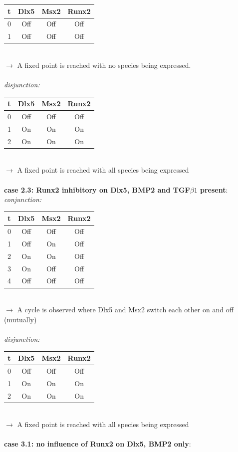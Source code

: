 \documentclass[11pt]{article}
\begin{document}
\begin{appendices}
\begin{tabular}{c c c c}
t & Dlx5 & Msx2 & Runx2 \\
\hline
0 & Off & Off & Off \\
1 & Off & Off & Off
\end{tabular}
\\
$\rightarrow$ A fixed point is reached with no species being expressed.  
\\ \\
\textit{disjunction:}
\\ 
\begin{tabular}{c c c c}
t & Dlx5 & Msx2 & Runx2 \\
\hline
0 & Off & Off & Off \\
1 & On & On & On \\
2 & On & On & On \\
\end{tabular}
\\
$\rightarrow$ A fixed point is reached with all species being expressed
\\ \\
\textbf{case 2.3: Runx2 inhibitory on Dlx5, BMP2 and TGF$\beta1$ present}: \\
\textit{conjunction:}
\\ 
\begin{tabular}{c c c c}
t & Dlx5 & Msx2 & Runx2 \\
\hline
0 & Off & Off & Off \\
1 & Off & On & Off \\
2 & On & On & Off \\
3 & On & Off & Off \\
4 & Off & Off & Off
\end{tabular}
\\
$\rightarrow$ A cycle is observed where Dlx5 and Msx2 switch each other on and off (mutually)  
\\ \\
\textit{disjunction:}
\\ 
\begin{tabular}{c c c c}
t & Dlx5 & Msx2 & Runx2 \\
\hline
0 & Off & Off & Off \\
1 & On & On & On \\
2 & On & On & On
\end{tabular}
\\
$\rightarrow$ A fixed point is reached with all species being expressed
\\ \\
\textbf{case 3.1: no influence of Runx2 on Dlx5, BMP2 only}: \\

\end{appendices}
\end{document}
